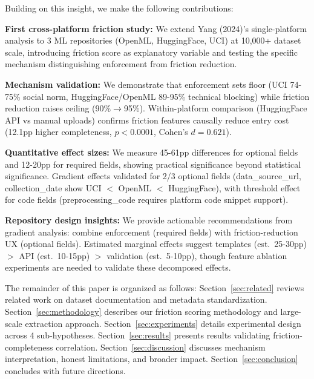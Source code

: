Building on this insight, we make the following contributions:

\textbf{First cross-platform friction study:} We extend Yang (2024)'s single-platform analysis to 3 ML repositories (OpenML, HuggingFace, UCI) at 10,000+ dataset scale, introducing friction score as explanatory variable and testing the specific mechanism distinguishing enforcement from friction reduction.

\textbf{Mechanism validation:} We demonstrate that enforcement sets floor (UCI 74-75\% social norm, HuggingFace/OpenML 89-95\% technical blocking) while friction reduction raises ceiling (90\%$\rightarrow$95\%). Within-platform comparison (HuggingFace API vs manual uploads) confirms friction features causally reduce entry cost (12.1pp higher completeness, $p<0.0001$, Cohen's $d=0.621$).

\textbf{Quantitative effect sizes:} We measure 45-61pp differences for optional fields and 12-20pp for required fields, showing practical significance beyond statistical significance. Gradient effects validated for 2/3 optional fields (data\_source\_url, collection\_date show UCI $<$ OpenML $<$ HuggingFace), with threshold effect for code fields (preprocessing\_code requires platform code snippet support).

\textbf{Repository design insights:} We provide actionable recommendations from gradient analysis: combine enforcement (required fields) with friction-reduction UX (optional fields). Estimated marginal effects suggest templates (est.\ 25-30pp) $>$ API (est.\ 10-15pp) $>$ validation (est.\ 5-10pp), though feature ablation experiments are needed to validate these decomposed effects.

The remainder of this paper is organized as follows: Section~\ref{sec:related} reviews related work on dataset documentation and metadata standardization. Section~\ref{sec:methodology} describes our friction scoring methodology and large-scale extraction approach. Section~\ref{sec:experiments} details experimental design across 4 sub-hypotheses. Section~\ref{sec:results} presents results validating friction-completeness correlation. Section~\ref{sec:discussion} discusses mechanism interpretation, honest limitations, and broader impact. Section~\ref{sec:conclusion} concludes with future directions.

